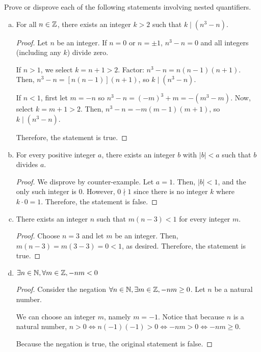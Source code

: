 \question Prove or disprove each of the following statements involving nested quantifiers.
\begin{enumerate}[(a)]
  \item For all $n \in\mathbb{Z}$, there exists an integer $k > 2$ such that $k \mid (n^3 - n)$.
        \begin{proof}
          Let $n$ be an integer. If $n=0$ or $n=\pm1$, $n^3-n=0$ and all integers (including any $k$) divide zero.

          If $n > 1$, we select $k=n+1 > 2$.
          Factor: $n^3-n = n(n-1)(n+1)$.
          Then, $n^3 - n = [n(n-1)](n+1)$, so $k \mid (n^3-n)$.

          If $n < 1$, first let $m = -n$ so $n^3-n = (-m)^3+m = -(m^3-m)$.
          Now, select $k = m+1 > 2$.
          Then, $n^3 - n = -m(m-1)(m+1)$, so $k \mid (n^3-n)$.

          Therefore, the statement is true.
        \end{proof}

  \item For every positive integer $a$, there exists an integer $b$ with $|b| < a$ such that $b$ divides $a$.
        \begin{proof}
          We disprove by counter-example.
          Let $a = 1$.
          Then, $|b| < 1$, and the only such integer is 0.
          However, $0 \nmid 1$ since there is no integer $k$ where $k \cdot 0 = 1$.
          Therefore, the statement is false.
        \end{proof}

  \item There exists an integer $n$ such that $m(n - 3) < 1$ for every integer $m$.
        \begin{proof}
          Choose $n = 3$ and let $m$ be an integer.
          Then, $m(n-3) = m(3-3) = 0 < 1$, as desired.
          Therefore, the statement is true.
        \end{proof}

  \item $\exists n\in\mathbb{N}, \forall m\in\mathbb{Z}, -nm < 0$
        \begin{proof}
          Consider the negation $\forall n\in\mathbb{N}, \exists m\in\mathbb{Z}, -nm \geq 0$.
          Let $n$ be a natural number.

          We can choose an integer $m$, namely $m=-1$.
          Notice that because $n$ is a natural number, $n > 0 \iff n(-1)(-1) > 0 \iff -nm > 0 \iff -nm \geq 0$.

          Because the negation is true, the original statement is false.
        \end{proof}
\end{enumerate}


